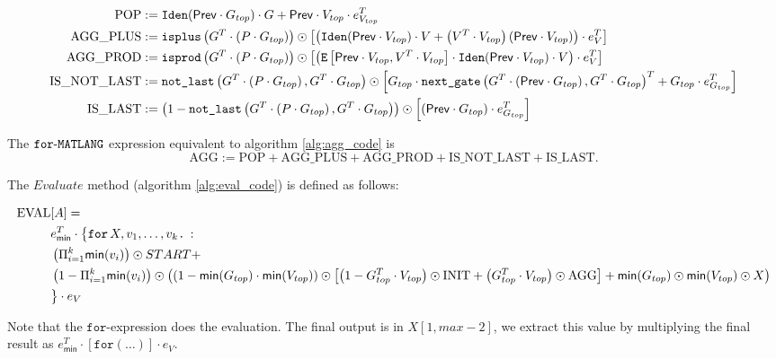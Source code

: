 \begin{align*}
	\text{POP} &:= \texttt{Iden}(\mathsf{Prev}\cdot G_{top})\cdot G + \mathsf{Prev}\cdot V_{top}\cdot e_{V_{top}}^T  \\
	\text{AGG{\_}PLUS} &:= \texttt{isplus}\left( G^T \cdot \left( P \cdot G_{top}\right) \right) \odot \left[ \left( \texttt{Iden}(\mathsf{Prev}\cdot V_{top}) \cdot V + \left( V^T \cdot V_{top} \right)\left( \mathsf{Prev}\cdot V_{top} \right)\right) \cdot e_{V}^T \right] \\
	\text{AGG{\_}PROD} &:= \texttt{isprod}\left(G^T \cdot \left( P \cdot G_{top}\right) \right) \odot \left[ \left( \texttt{E}\left[ \mathsf{Prev}\cdot V_{top}, V^T \cdot V_{top} \right] \cdot \texttt{Iden}(\mathsf{Prev}\cdot V_{top}) \cdot V \right) \cdot e_{V}^T \right] \\
	\text{IS{\_}NOT{\_}LAST} &:= \texttt{not{\_}last}\left(G^T \cdot \left( P \cdot G_{top}\right),G^T \cdot G_{top} \right) \odot \left[  G_{top} \cdot \texttt{next{\_}gate}\left(G^T \cdot \left( \mathsf{Prev}\cdot G_{top} \right) , G^T \cdot G_{top} \right)^T + G_{top}\cdot e_{G_{top}}^T \right] \\
	\text{IS{\_}LAST} &:= \left( 1 - \texttt{not{\_}last}\left(G^T \cdot \left( P \cdot G_{top}\right),G^T \cdot G_{top} \right) \right)\odot \left[ \left( \mathsf{Prev}\cdot G_{top} \right) \cdot e_{G_{top}}^T \right]
\end{align*}

The $\texttt{for}\text{-}\texttt{MATLANG}$ expression equivalent to algorithm \ref{alg:agg_code} is $$\text{AGG}:=\text{POP} + \text{AGG{\_}PLUS}+\text{AGG{\_}PROD}+\text{IS{\_}NOT{\_}LAST}+\text{IS{\_}LAST}.$$

The $Evaluate$ method (algorithm \ref{alg:eval_code}) is defined as follows:

\begin{align*}
	\text{EVAL}&[A]= \\
	&e_{\mathsf{min}}^T \cdot \big\lbrace \texttt{for}\, X,v_1, \ldots, v_k \texttt{.}\, : \\
	&\left( \Pi_{i=1}^k \mathsf{min}(v_i)\right) \odot START + \\
	&\left( 1- \Pi_{i=1}^k \mathsf{min}(v_i)\right) \odot \left( \left(1 - \mathsf{min}(G_{top})\cdot \mathsf{min}(V_{top}) \right) \odot \left[ \left( 1 - G_{top}^T\cdot V_{top} \right) \odot \text{INIT} + \left(  G_{top}^T\cdot V_{top} \right) \odot \text{AGG} \right] + \mathsf{min}(G_{top})\odot \mathsf{min}(V_{top})\odot X\right) \\ 
	&\big\rbrace\cdot e_{V}
\end{align*}

Note that the $ \texttt{for}$-expression does the evaluation. The final output is in $X[1,max-2]$, we extract this value by multiplying the final result as $e_{\mathsf{min}}^T\cdot [\texttt{for}(\ldots )]\cdot e_{V}$.

